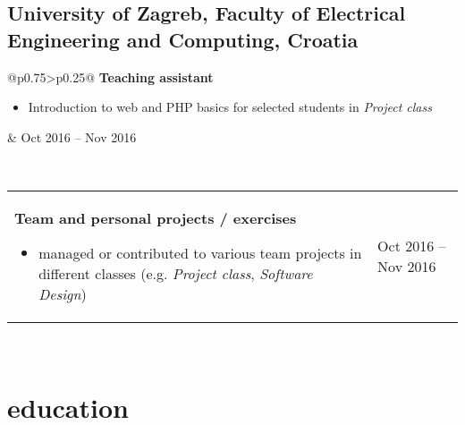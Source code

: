 \documentclass[a4paper]{article}
\makeatletter
\newlength{\tablewidth}
\newenvironment{period}[2]{%
\newcommand{\sarma}{#2}%
\setlength{\tablewidth}{\linewidth}
\addtolength{\tablewidth}{-2\tabcolsep}
\begin{tabular}{@{}p{0.75\tablewidth}>{\raggedleft\arraybackslash}p{0.25\tablewidth}@{}}%
#1 \newline
\begin{itemize}
}{%
\end{itemize} & \sarma \\%
\end{tabular}\\
}
\makeatother
\begin{document}
\subsection{University of Zagreb, Faculty of Electrical Engineering and Computing, Croatia}
\begin{period}{\textbf{Teaching assistant}}{Oct 2016 -- Nov 2016}
	\item Introduction to web and PHP basics for selected students in \textit{Project class}
\end{period}
\begin{period}{\textbf{Team and personal projects / exercises}}{}
	\item managed or contributed to various team projects in different classes (e.g. \textit{Project class}, \textit{Software Design})
\end{period}

\section{education}
\end{document}
